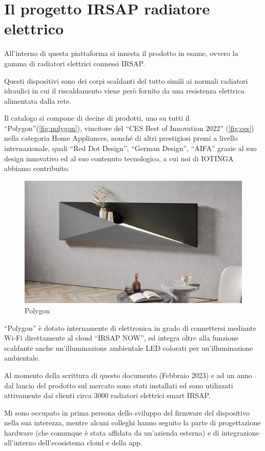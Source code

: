 \documentclass[12pt,a4paper,twoside,titlepage]{book}
\begin{document}
\section{Il progetto IRSAP radiatore elettrico}

All'interno di questa piattaforma si innesta il prodotto in esame,
ovvero la gamma di radiatori elettrici connessi IRSAP. 

Questi dispositivi sono dei corpi scaldanti del tutto simili ai normali radiatori 
idraulici in cui il riscaldamento viene però fornito da una resistenza elettrica 
alimentata dalla rete. 

Il catalogo si compone di 
decine di prodotti, uno su tutti il ``Polygon''(\autoref{fig:polygon}), vincitore del
``CES Best of Innovation 2022'' (\autoref{fig:ces}) nella categoria Home Appliances,
nonché di altri prestigiosi premi a livello internazionale, quali ``Red Dot Design'',
``German Design'', ``AIFA'' %
grazie al suo design innovativo ed al suo contenuto tecnologico,
a cui noi di IOTINGA abbiamo contribuito.

\begin{figure}[ht]
    \centering
    \includegraphics[width=12cm]{img/polygon.jpeg}
    \caption{Polygon}
    \label{fig:polygon}
\end{figure}

``Polygon'' è dotato internamente di elettronica in grado di connettersi mediante
Wi-Fi direttamente al cloud ``IRSAP NOW'', ed integra oltre alla funzione scaldante
anche un'illuminazione ambientale LED colorati per un'illuminazione ambientale.

Al momento della scrittura di questo documento (Febbraio 2023) e ad un anno dal lancio 
del prodotto sul mercato sono stati installati ed sono utilizzati attivamente dai clienti 
circa 3000 radiatori elettrici smart IRSAP. 

Mi sono occupato in prima persona dello sviluppo del firmware del dispositivo nella
sua interezza, mentre alcuni colleghi hanno seguito la parte di progettazione hardware
(che comunque è stata affidata da un'azienda esterna) e di integrazione all'interno
dell'ecosistema cloud e della app.
\end{document}
